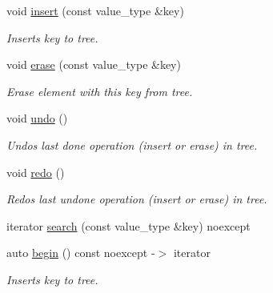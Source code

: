 \begin{DoxyCompactItemize}
void \hyperlink{classlab_1_1forest_1_1UndoableTree_aed97dba3340b6aec26acac81d23c8525}{insert} (const value\+\_\+type \&key)
\begin{DoxyCompactList}\small\item\em Inserts key to tree. \end{DoxyCompactList}\item 
\mbox{\label{classlab_1_1forest_1_1UndoableTree_a5d24d3854ab12114b6d6184ecdd21f56}} 
void \hyperlink{classlab_1_1forest_1_1UndoableTree_a5d24d3854ab12114b6d6184ecdd21f56}{erase} (const value\+\_\+type \&key)
\begin{DoxyCompactList}\small\item\em Erase element with this key from tree. \end{DoxyCompactList}\item 
void \hyperlink{classlab_1_1forest_1_1UndoableTree_a4f19003d8156b047de5ff2869d5ac316}{undo} ()
\begin{DoxyCompactList}\small\item\em Undos last done operation (insert or erase) in tree. \end{DoxyCompactList}\item 
\mbox{\label{classlab_1_1forest_1_1UndoableTree_a809f804c937c5963f4370ec7312eae0e}} 
void \hyperlink{classlab_1_1forest_1_1UndoableTree_a809f804c937c5963f4370ec7312eae0e}{redo} ()
\begin{DoxyCompactList}\small\item\em Redos last undone operation (insert or erase) in tree. \end{DoxyCompactList}\item 
iterator \hyperlink{classlab_1_1forest_1_1UndoableTree_a6e21757708a93c084d55f2b95874d8df}{search} (const value\+\_\+type \&key) noexcept
\item 
\mbox{\label{classlab_1_1forest_1_1UndoableTree_a70250f012747174b8935cf9fe5fe72ed}} 
auto \hyperlink{classlab_1_1forest_1_1UndoableTree_a70250f012747174b8935cf9fe5fe72ed}{begin} () const noexcept -\/$>$ iterator
\begin{DoxyCompactList}\small\item\em Inserts key to tree. \end{DoxyCompactList}\item 
\mbox{\label{classlab_1_1forest_1_1UndoableTree_af404b6bb41ddad0291cf2ab22deee478}} 

\end{DoxyCompactItemize}
